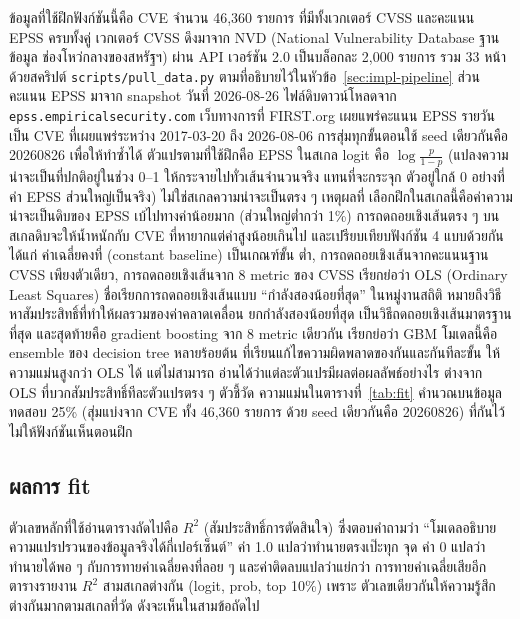 ข้อมูลที่ใช้ฝึกฟังก์ชันนี้คือ CVE จำนวน 46{,}360 รายการ ที่มีทั้งเวกเตอร์ CVSS และคะแนน
EPSS ครบทั้งคู่ เวกเตอร์ CVSS ดึงมาจาก NVD (National Vulnerability Database ฐานข้อมูล
ช่องโหว่กลางของสหรัฐฯ) ผ่าน API เวอร์ชัน 2.0 เป็นบล็อกละ 2{,}000 รายการ รวม 33 หน้า
ด้วยสคริปต์ \texttt{scripts/pull\_data.py} ตามที่อธิบายไว้ในหัวข้อ~\ref{sec:impl-pipeline}
ส่วนคะแนน EPSS มาจาก snapshot วันที่ 2026-08-26 ไฟล์ดิบดาวน์โหลดจาก
\texttt{epss.empiricalsecurity.com} เว็บทางการที่ FIRST.org เผยแพร่คะแนน EPSS
รายวัน เป็น CVE ที่เผยแพร่ระหว่าง 2017-03-20 ถึง 2026-08-06 การสุ่มทุกขั้นตอนใช้ seed
เดียวกันคือ 20260826
เพื่อให้ทำซ้ำได้ ตัวแปรตามที่ใช้ฝึกคือ EPSS ในสเกล logit คือ $\log\frac{p}{1-p}$
(แปลงความน่าจะเป็นที่ปกติอยู่ในช่วง 0--1 ให้กระจายไปทั่วเส้นจำนวนจริง แทนที่จะกระจุก
ตัวอยู่ใกล้ 0 อย่างที่ค่า EPSS ส่วนใหญ่เป็นจริง) ไม่ใช่สเกลความน่าจะเป็นตรง ๆ เหตุผลที่
เลือกฝึกในสเกลนี้คือค่าความน่าจะเป็นดิบของ EPSS เบ้ไปทางค่าน้อยมาก (ส่วนใหญ่ต่ำกว่า
1\%) การถดถอยเชิงเส้นตรง ๆ บนสเกลดิบจะให้น้ำหนักกับ CVE ที่หายากแต่ค่าสูงน้อยเกินไป
และเปรียบเทียบฟังก์ชัน 4 แบบด้วยกัน ได้แก่ ค่าเฉลี่ยคงที่ (constant baseline) เป็นเกณฑ์ขั้น
ต่ำ, การถดถอยเชิงเส้นจากคะแนนฐาน CVSS เพียงตัวเดียว, การถดถอยเชิงเส้นจาก 8 metric
ของ CVSS เรียกย่อว่า OLS (Ordinary Least Squares) ชื่อเรียกการถดถอยเชิงเส้นแบบ
``กำลังสองน้อยที่สุด'' ในหมู่งานสถิติ หมายถึงวิธีหาสัมประสิทธิ์ที่ทำให้ผลรวมของค่าคลาดเคลื่อน
ยกกำลังสองน้อยที่สุด เป็นวิธีถดถอยเชิงเส้นมาตรฐานที่สุด และสุดท้ายคือ gradient boosting
จาก 8 metric เดียวกัน เรียกย่อว่า GBM โมเดลนี้คือ ensemble ของ decision tree หลายร้อยต้น
ที่เรียนแก้ไขความผิดพลาดของกันและกันทีละขั้น ให้ความแม่นสูงกว่า OLS ได้ แต่ไม่สามารถ
อ่านได้ว่าแต่ละตัวแปรมีผลต่อผลลัพธ์อย่างไร ต่างจาก OLS ที่บวกสัมประสิทธิ์ทีละตัวแปรตรง ๆ
ตัวชี้วัด
ความแม่นในตารางที่~\ref{tab:fit} คำนวณบนข้อมูลทดสอบ 25\% (สุ่มแบ่งจาก CVE ทั้ง
46{,}360 รายการ ด้วย seed เดียวกันคือ 20260826) ที่กันไว้ไม่ให้ฟังก์ชันเห็นตอนฝึก

\subsection{ผลการ fit}\label{sec:eval-pe-fit}

ตัวเลขหลักที่ใช้อ่านตารางถัดไปคือ $R^2$ (สัมประสิทธิ์การตัดสินใจ) ซึ่งตอบคำถามว่า
``โมเดลอธิบายความแปรปรวนของข้อมูลจริงได้กี่เปอร์เซ็นต์'' ค่า 1.0 แปลว่าทำนายตรงเป๊ะทุก
จุด ค่า 0 แปลว่าทำนายได้พอ ๆ กับการทายค่าเฉลี่ยคงที่ลอย ๆ และค่าติดลบแปลว่าแย่กว่า
การทายค่าเฉลี่ยเสียอีก ตารางรายงาน $R^2$ สามสเกลต่างกัน (logit, prob, top 10\%) เพราะ
ตัวเลขเดียวกันให้ความรู้สึกต่างกันมากตามสเกลที่วัด ดังจะเห็นในสามข้อถัดไป

